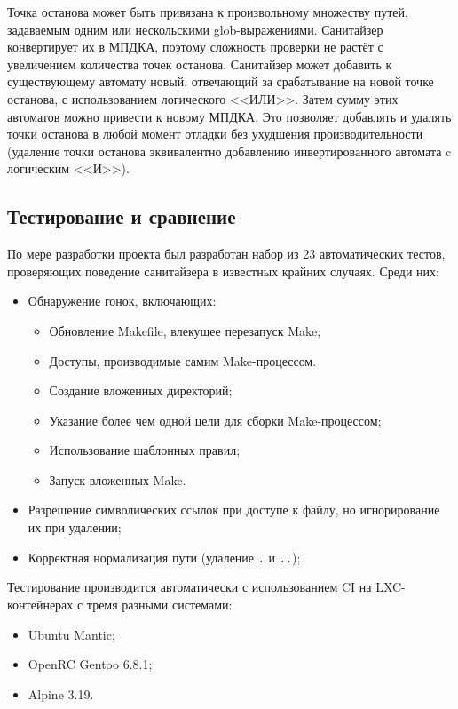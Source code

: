Точка останова может быть привязана к произвольному множеству путей, задаваемым одним или нескольскими glob-выражениями. Санитайзер конвертирует их в МПДКА, поэтому сложность проверки не растёт с увеличением количества точек останова. Санитайзер может добавить к существующему автомату новый, отвечающий за срабатывание на новой точке останова, с использованием логического <<ИЛИ>>. Затем сумму этих автоматов можно привести к новому МПДКА. Это позволяет добавлять и удалять точки останова в любой момент отладки без ухудшения производительности (удаление точки останова эквивалентно добавлению инвертированного автомата c логическим <<И>>).

\subsection{Тестирование и сравнение}

По мере разработки проекта был разработан набор из 23 автоматических тестов, проверяющих поведение санитайзера в известных крайних случаях. Среди них:

\begin{itemize}
    \item Обнаружение гонок, включающих:
    \begin{itemize}
        \item Обновление Makefile, влекущее перезапуск Make;
        \item Доступы, производимые самим Make-процессом.
        \item Создание вложенных директорий;
        \item Указание более чем одной цели для сборки Make-процессом;
        \item Использование шаблонных правил;
        \item Запуск вложенных Make.
    \end{itemize}
    \item Разрешение символических ссылок при доступе к файлу, но игнорирование их при удалении;
    \item Корректная нормализация пути (удаление \texttt{.} и \texttt{..});
\end{itemize}

Тестирование производится автоматически с использованием CI на LXC-контейнерах с тремя разными системами:

\begin{itemize}
    \item Ubuntu Mantic;
    \item OpenRC Gentoo 6.8.1;
    \item Alpine 3.19.
\end{itemize}

